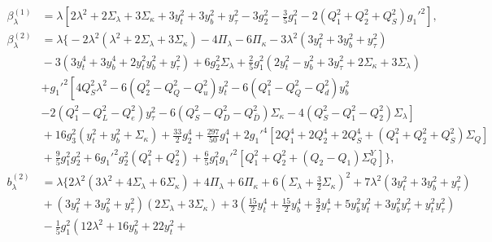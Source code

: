 \documentclass[preprint,amsmath,amssymb,aps,superscriptaddress,prd,
showpacs,floatfix,nofootinbib]{revtex4-1}
\begin{document}
\begin{subequations} \label{eq:USSMLambdaBetas}
\begin{align}
\beta_\lambda^{(1)} &= \lambda \left [ 2 \lambda^2 + 2 \Sigma_\lambda +
3 \Sigma_\kappa + 3 y_t^2 + 3 y_b^2 + y_{\tau }^2 - 3 g_2^2 - \frac{3}{5}
g_1^2 - 2 \left ( Q_1^2 + Q_2^2 + Q_S^2 \right ) g_1'^2 \right ] ,
\label{eq:USSMLambdaBetaOneLoop} \\
\beta_\lambda^{(2)} &= \lambda \bigg \{ -2 \lambda^2 \left ( \lambda^2 +
2 \Sigma_\lambda + 3 \Sigma_\kappa \right ) - 4 \Pi_\lambda - 6 \Pi_\kappa
- 3 \lambda^2 \left ( 3 y_t^2 + 3 y_b^2 + y_\tau^2 \right ) \nonumber \\
& {} - 3 \left ( 3 y_t^4 + 3 y_b^4 + 2 y_t^2 y_b^2 + y_\tau^2 \right ) +
6 g_2^2 \Sigma_\lambda + \frac{2}{5} g_1^2 \left ( 2 y_t^2 - y_b^2 +
3 y_\tau^2 + 2 \Sigma_\kappa + 3 \Sigma_\lambda \right ) \nonumber \\
& {} \left . + g_1'^2 \left [ 4 Q_S^2 \lambda^2 - 6 \left ( Q_2^2 - Q_Q^2
- Q_u^2 \right ) y_t^2 - 6 \left ( Q_1^2 - Q_Q^2 - Q_d^2 \right ) y_b^2
\right . \right . \nonumber \\
& {} \left . - 2 \left ( Q_1^2 - Q_L^2 - Q_e^2 \right ) y_\tau^2 -
6 \left ( Q_S^2 - Q_D^2 - Q_{\overline{D}}^2 \right ) \Sigma_\kappa -
4 \left ( Q_S^2 - Q_1^2 - Q_2^2 \right ) \Sigma_\lambda \right ] \nonumber \\
& {} + 16 g_3^2 \left ( y_t^2 + y_b^2 + \Sigma_\kappa \right ) +
\frac{33}{2} g_2^4 + \frac{297}{50} g_1^4 + 2 g_1'^4 \left [ 2 Q_1^4 +
2 Q_2^4 + 2 Q_S^4 + \left ( Q_1^2 + Q_2^2 + Q_S^2 \right ) \Sigma_{Q}
\right ] \nonumber \\
& {} + \frac{9}{5} g_1^2 g_2^2 + 6 g_1'^2 g_2^2 \left ( Q_1^2 + Q_2^2 \right )
+ \frac{6}{5} g_1^2 g_1'^2 \left [ Q_1^2 + Q_2^2 + \left ( Q_2 - Q_1 \right )
\Sigma_Q^Y \right ] \bigg \} , \label{eq:USSMLambdaBetaTwoLoop} \\
b_\lambda^{(2)} &= \lambda \bigg \{ 2 \lambda^2 \left ( 3 \lambda^2 +
4 \Sigma_\lambda + 6 \Sigma_\kappa \right ) + 4 \Pi_\lambda + 6\Pi_\kappa +
6 \left ( \Sigma_\lambda + \frac{3}{2} \Sigma_\kappa \right )^2 +
7 \lambda^2 \left ( 3 y_t^2 + 3 y_b^2 + y_\tau^2 \right ) \nonumber \\
& {} + \left ( 3 y_t^2 + 3 y_b^2 + y_\tau^2 \right ) \left ( 2 \Sigma_\lambda
+ 3 \Sigma_\kappa \right ) + 3 \left ( \frac{15}{2} y_t^4 + \frac{15}{2} y_b^4
+ \frac{3}{2} y_\tau^4 + 5 y_b^2 y_t^2 + 3 y_b^2 y_\tau^2 + y_t^2 y_\tau^2
\right ) \nonumber \\
& {} - \frac{1}{5} g_1^2 \left ( 12 \lambda^2 + 16 y_b^2 + 22 y_t^2 +

\end{align}
\end{subequations}
\end{document}
